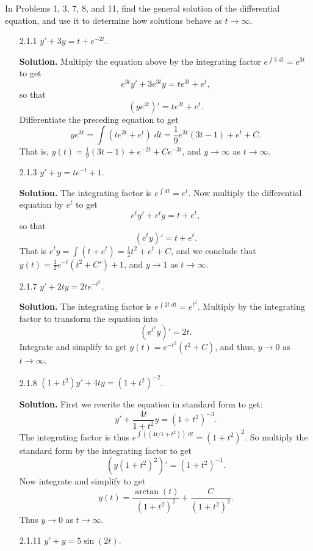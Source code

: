 In Problems 1, 3, 7, 8, and 11, find the general solution of the differential
equation, and use it to determine how solutions behave as
$t \rightarrow \infty$.
\begin{enumerate}
   \item[2.1.1]   $y' + 3y = t + e^{-2t}$.

      \textbf{Solution.} Multiply the equation above by the integrating factor
      $e^{\int 3\;dt} = e^{3t}$ to get
      $$e^{3t}y' + 3e^{3t}y = te^{3t} + e^t,$$
      so that
      $$(ye^{3t})' = te^{3t} + e^t.$$
      Differentiate the preceding equation to get
      $$ye^{3t} = \int (te^{3t} + e^t)\;dt = \frac{1}{9}e^{3t}(3t - 1) + e^t +
        C.$$
      That is, $y(t) = \frac{1}{9}(3t - 1) + e^{-2t} + Ce^{-3t}$, and
      $y \rightarrow \infty$ as $t \rightarrow \infty$.
   \item[2.1.3]   $y' + y = te^{-t} + 1$.

      \textbf{Solution.} The integrating factor is $e^{\int dt} = e^t$. Now
      multiply the differential equation by $e^t$ to get
      $$e^ty' + e^ty = t + e^t,$$
      so that
      $$(e^ty)' = t + e^t.$$
      That is $e^ty = \int(t + e^t) = \frac{1}{2}t^2 + e^t + C$, and we conclude
      that $y(t) = \frac{1}{2}e^{-t}(t^2 + C') + 1$, and $y \rightarrow 1$ as
      $t \rightarrow \infty$.
   \item[2.1.7]   $y' + 2ty = 2te^{-t^2}$.

      \textbf{Solution.} The integrating factor is
      $e^{\int 2t\;dt} = e^{t^2}$. Multiply by the integrating factor
      to transform the equation into
      $$(e^{t^2}y)' = 2t.$$
      Integrate and simplify to get $y(t) = e^{-t^2}(t^2 + C)$, and thus,
      $y \rightarrow 0$ as $t \rightarrow \infty$.
   \item[2.1.8]   $(1 + t^2)y' + 4ty = (1 + t^2)^{-2}$.

      \textbf{Solution.} First we rewrite the equation in standard form to get:
      $$y' + \frac{4t}{1+t^2}y = (1 + t^2)^{-3}.$$
      The integrating factor is thus $e^{\int((4t/1+t^2))\;dt} = (1 + t^2)^2$.
      So multiply the standard form by the integrating factor to get
      $$(y(1+t^2)^2)' = (1+t^2)^{-1}.$$
      Now integrate and simplify to get
      $$y(t) = \frac{\arctan(t)}{(1+t^2)^2} + \frac{C}{(1+t^2)^2}.$$
      Thus $y \rightarrow 0$ as $t \rightarrow \infty$.
   \item[2.1.11]  $y' + y = 5\sin(2t)$.


\end{enumerate}

